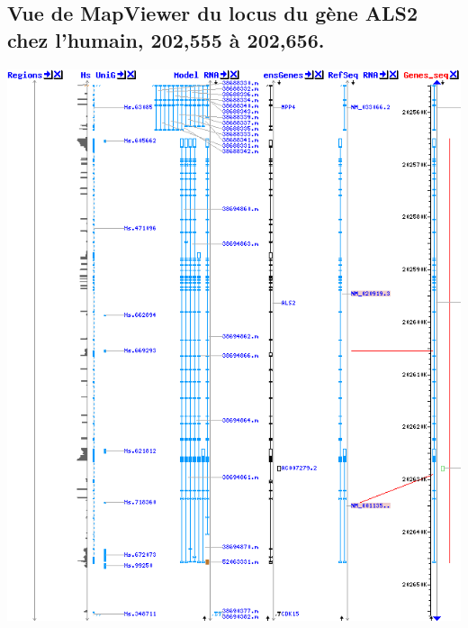 \documentclass[11pt]{article} %
\begin{document}
\subsection{Vue de MapViewer du locus du gène ALS2 chez l'humain, 202,555 à 202,656.}\label{4}
\includegraphics[width=\linewidth]{annexes/annexe1b_mapviewer_202555-202656.png}
\end{document}
